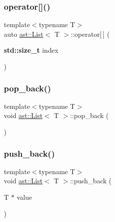 \subsubsection{\texorpdfstring{operator[]()}{operator[]()}}
{\footnotesize\ttfamily template$<$typename T$>$ \\
auto \hyperlink{structast_1_1_list}{ast\+::\+List}$<$ T $>$\+::operator\mbox{[}$\,$\mbox{]} (\begin{DoxyParamCaption}\item[{\textbf{ std\+::size\+\_\+t}}]{index }\end{DoxyParamCaption})\hspace{0.3cm}{\ttfamily [inline]}}

\mbox{\label{structast_1_1_list_ac13ecce7f8bedbda4f3f61fe5f61d0b1}} 
\subsubsection{\texorpdfstring{pop\+\_\+back()}{pop\_back()}}
{\footnotesize\ttfamily template$<$typename T$>$ \\
void \hyperlink{structast_1_1_list}{ast\+::\+List}$<$ T $>$\+::pop\+\_\+back (\begin{DoxyParamCaption}{ }\end{DoxyParamCaption})\hspace{0.3cm}{\ttfamily [inline]}}

\mbox{\label{structast_1_1_list_a78dd94897b4aea42d9c7851314c379d2}} 
\subsubsection{\texorpdfstring{push\+\_\+back()}{push\_back()}}
{\footnotesize\ttfamily template$<$typename T$>$ \\
void \hyperlink{structast_1_1_list}{ast\+::\+List}$<$ T $>$\+::push\+\_\+back (\begin{DoxyParamCaption}\item[{T $\ast$}]{value }\end{DoxyParamCaption})\hspace{0.3cm}{\ttfamily [inline]}}



